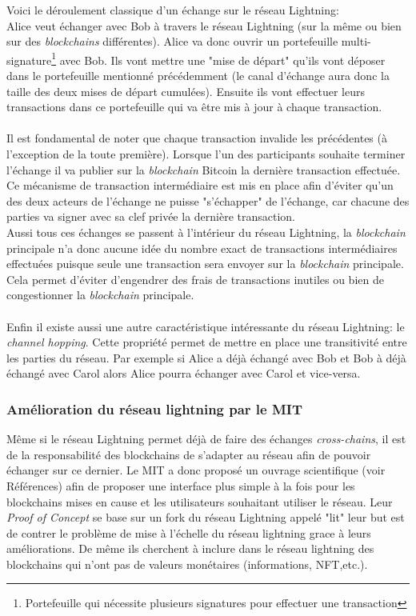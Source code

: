 Voici le déroulement classique d'un échange sur le réseau Lightning:\\ Alice veut échanger avec Bob à travers le réseau Lightning (sur la même ou bien sur des \textit{blockchains} différentes). 
Alice va donc ouvrir un portefeuille multi-signature\footnote{Portefeuille qui nécessite plusieurs signatures pour effectuer une transaction} avec Bob. Ils vont mettre une "mise de départ" qu'ils vont déposer dans le portefeuille mentionné précédemment (le canal d'échange aura donc la taille des deux mises de départ cumulées).
Ensuite ils vont effectuer leurs transactions dans ce portefeuille qui va être mis à jour à chaque transaction.\\ \\ 
Il est fondamental de noter que chaque transaction invalide les précédentes (à l'exception de la toute première). Lorsque l'un des participants souhaite terminer l'échange il va publier sur la \textit{blockchain} Bitcoin la dernière transaction effectuée.
Ce mécanisme de transaction intermédiaire est mis en place afin d'éviter qu'un des deux acteurs de l'échange ne puisse "s'échapper" de l'échange, car chacune des parties va signer avec sa clef privée la dernière transaction. \\
Aussi tous ces échanges se passent à l'intérieur du réseau Lightning, la \textit{blockchain} principale n'a donc aucune idée du nombre exact de transactions intermédiaires effectuées puisque seule une transaction sera envoyer sur la \textit{blockchain} principale. 
Cela permet d'éviter d'engendrer des frais de transactions inutiles ou bien de congestionner la \textit{blockchain} principale.\\ \\
 Enfin il existe aussi une autre caractéristique intéressante du réseau Lightning: le \textit{channel hopping}. 
Cette propriété permet de mettre en place une transitivité entre les parties du réseau. Par exemple si Alice a déjà échangé avec Bob et Bob à déjà échangé avec Carol alors Alice pourra échanger avec Carol et vice-versa. 


\subsubsection{Amélioration du réseau lightning par le MIT}

Même si le réseau Lightning permet déjà de faire des échanges \textit{cross-chains}, il est de la responsabilité des blockchains de s'adapter au réseau afin de pouvoir échanger sur ce dernier.
Le MIT a donc proposé un ouvrage scientifique (voir Références) afin de proposer une interface plus simple à la fois pour les blockchains mises en cause et les utilisateurs souhaitant utiliser le réseau.
Leur \textit{Proof of Concept} se base sur un fork du réseau Lightning appelé "lit" leur but est de contrer le problème de mise à l'échelle du réseau lightning grace à leurs améliorations.
De même ils cherchent à inclure dans le réseau lightning des blockchains qui n'ont pas de valeurs monétaires (informations, NFT,etc.).

